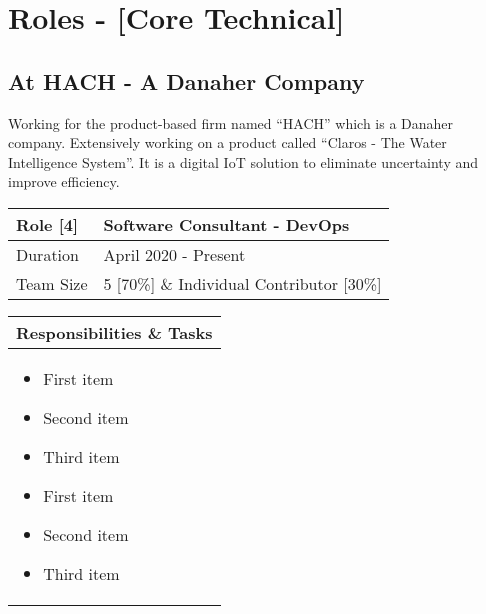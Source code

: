 \documentclass[11pt, a4paper]{article}
\begin{document}
\section*{Roles - [Core Technical]}
	\subsection*{At HACH - A Danaher Company}
Working for the product-based firm named “HACH” which is a Danaher company.  Extensively working on a product called “Claros - The Water Intelligence System”. It is a digital IoT solution to eliminate uncertainty and improve efficiency. \\

\noindent\begin{tabular}{|p{1.5in}|p{5.45in}|}
\hline
\rowcolor{black!20} Role [4] & Software Consultant - DevOps\\
\hline
Duration & April 2020 - Present\\
\hline
Team Size & 5 [70\%] \& Individual Contributor [30\%]\\
\hline
\end{tabular}
\newline
\vspace*{1mm}
\newline
\begin{tabular}{|p{7.122in}|}
\hline
\rowcolor{black!5} Responsibilities \& Tasks\\
\hline
\begin{itemize}[noitemsep, nolistsep]
\item First item
\item Second item
\item Third item
\item First item
\item Second item
\item Third item
\end{itemize} \\
\hline
\end{tabular}
\pagebreak
\end{document}
